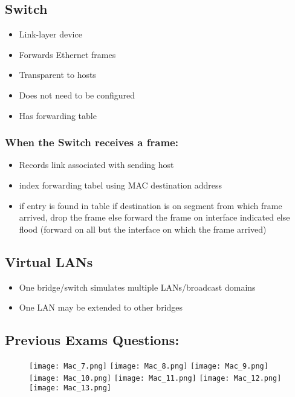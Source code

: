 \documentclass[../resumosRCOM.tex]{subfiles}
\begin{document}
\subsection{Switch}
\begin{itemize}
    \item Link-layer device
    \item Forwards Ethernet frames
    \item Transparent to hosts
    \item Does not need to be configured
    \item Has forwarding table
\end{itemize}
\subsubsection{When the Switch receives a frame:}
\begin{itemize}
    \item Records link associated with sending host
    \item index forwarding tabel using MAC destination address
    \item if entry is found in table
    \subitem if destination is on segment from which frame arrived,
    \subsubitem drop the frame
    \subitem else
    \subsubitem forward the frame on interface indicated
    else flood (forward on all but the interface on which the frame arrived)
\end{itemize}
\subsection{Virtual LANs}
\begin{itemize}
    \item One bridge/switch simulates multiple LANs/broadcast domains
    \item One LAN may be extended to other bridges
\end{itemize}
\subsection{Previous Exams Questions:}
\begin{figure}[H]
    \centering
    \texttt{[image: Mac\_7.png]}
    \newline
    \newline
    \texttt{[image: Mac\_8.png]}
    \newline
    \newline
    \texttt{[image: Mac\_9.png]}
    \newline
    \newline
    \texttt{[image: Mac\_10.png]}
    \newline
    \newline
    \texttt{[image: Mac\_11.png]}
    \newline
    \newline
    \texttt{[image: Mac\_12.png]}
    \newline
    \newline
    \texttt{[image: Mac\_13.png]}
\end{figure}
\end{document}
